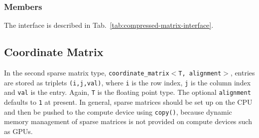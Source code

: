 \subsubsection{Members}
The interface is described in Tab.~\ref{tab:compressed-matrix-interface}. 

\subsection{Coordinate Matrix}
In the second sparse matrix type, \texttt{coordinate\_matrix$<$T, alignment$>$}, 
entries are stored as triplets \texttt{(i,j,val)}, where \texttt{i} is the row index, \texttt{j} is the column index and \texttt{val} is the entry. 
Again, \texttt{T} is the floating point type. The optional \texttt{alignment} defaults to \texttt{1} at present.
In general, sparse matrices should be set up on the
CPU and then be pushed to the compute device using \texttt{copy()}, because dynamic memory management of sparse matrices is not provided on {\OpenCL} compute devices such as GPUs.

